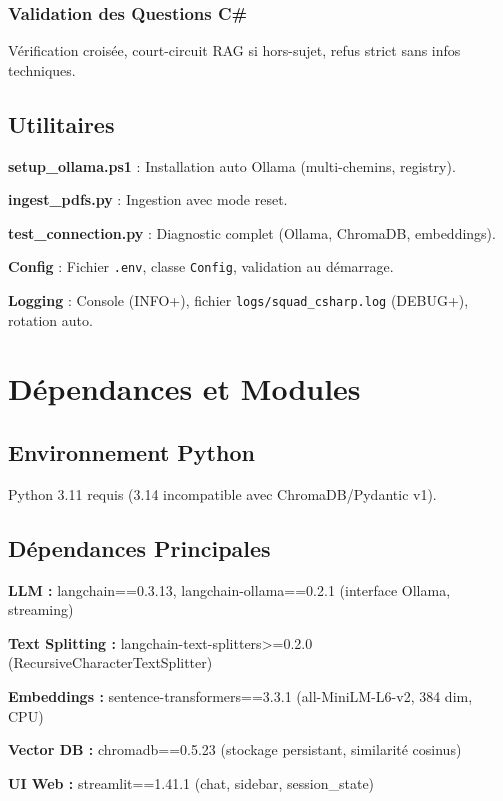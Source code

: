\documentclass[12pt,a4paper]{report}
\begin{document}
\subsection{Validation des Questions C\#}

Vérification croisée, court-circuit RAG si hors-sujet, refus strict sans infos techniques.

\section{Utilitaires}

\textbf{setup\_ollama.ps1} : Installation auto Ollama (multi-chemins, registry).

\textbf{ingest\_pdfs.py} : Ingestion avec mode reset.

\textbf{test\_connection.py} : Diagnostic complet (Ollama, ChromaDB, embeddings).

\textbf{Config} : Fichier \texttt{.env}, classe \texttt{Config}, validation au démarrage.

\textbf{Logging} : Console (INFO+), fichier \texttt{logs/squad\_csharp.log} (DEBUG+), rotation auto.

\chapter{Dépendances et Modules}

\section{Environnement Python}

Python 3.11 requis (3.14 incompatible avec ChromaDB/Pydantic v1).

\section{Dépendances Principales}

\textbf{LLM :} langchain==0.3.13, langchain-ollama==0.2.1 (interface Ollama, streaming)

\textbf{Text Splitting :} langchain-text-splitters>=0.2.0 (RecursiveCharacterTextSplitter)

\textbf{Embeddings :} sentence-transformers==3.3.1 (all-MiniLM-L6-v2, 384 dim, CPU)

\textbf{Vector DB :} chromadb==0.5.23 (stockage persistant, similarité cosinus)

\textbf{UI Web :} streamlit==1.41.1 (chat, sidebar, session\_state)
\end{document}
